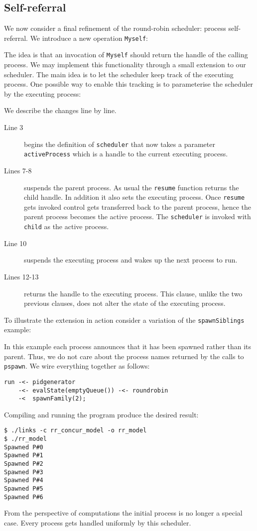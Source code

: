 \documentclass[12pt,mscres,cdtppar,twoside,openright,logo,rightchapter,normalheadings]{infthesis}
\newcommand{\snippet}[1]{}
\theoremstyle{definition}
\begin{document}
\subsection{Self-referral}

We now consider a final refinement of the round-robin scheduler:
process self-referral. We introduce a new operation \lstinline$Myself$:
%
\snippet{myself.links}
%
The idea is that an invocation of \lstinline$Myself$ should return the
handle of the calling process. We may implement this functionality
through a small extension to our scheduler. The main idea is to let
the scheduler keep track of the executing process. One possible way to
enable this tracking is to parameterise the scheduler by the executing
process:
%

%
We describe the changes line by line.
\begin{description}
\item[Line 3] begins the definition of \lstinline$scheduler$ that now
  takes a parameter \lstinline$activeProcess$ which is a handle to the
  current executing process.
\item[Lines 7-8] suspends the parent process. As usual the
  \lstinline$resume$ function returns the child handle. In addition it
  also sets the executing process. Once \lstinline$resume$ gets
  invoked control gets transferred back to the parent process, hence
  the parent process becomes the active process.  The
  \lstinline$scheduler$ is invoked with \lstinline$child$ as the
  active process.
\item[Line 10] suspends the executing process and wakes up the next
  process to run.
\item[Lines 12-13] returns the handle to the executing process. This
  clause, unlike the two previous clauses, does not alter the state of
  the executing process.
\end{description}

To illustrate the extension in action consider a variation of the
\lstinline$spawnSiblings$ example:
%

%
In this example each process announces that it has been spawned rather
than its parent. Thus, we do not care about the process names returned
by the calls to \lstinline$pspawn$. We wire everything together as
follows:
%
\begin{lstlisting}
run -<- pidgenerator 
    -<- evalState(emptyQueue()) -<- roundrobin 
    -<  spawnFamily(2);
\end{lstlisting}
%
Compiling and running the program produce the desired result:
%
\begin{lstlisting}[style=terminal]
$ ./links -c rr_concur_model -o rr_model
$ ./rr_model
Spawned P#0
Spawned P#1
Spawned P#2
Spawned P#3
Spawned P#4
Spawned P#5
Spawned P#6
\end{lstlisting}
%
From the perspective of computations the initial process is no longer
a special case. Every process gets handled uniformly by this
scheduler. 
\end{document}

